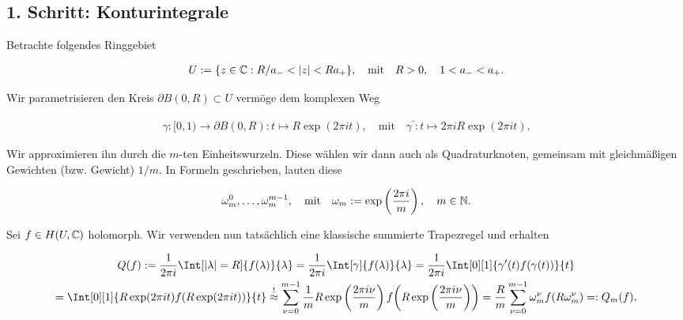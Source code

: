 \subsection*{1. Schritt: Konturintegrale}

Betrachte folgendes Ringgebiet

\begin{align*}
    U := {\left \{ z \in \mathbb{C}: R / a_- < |z| < R a_+ \right \}},
    \quad
    \text{mit}
    \quad
    R > 0,
    \quad
    1 < a_- < a_+.
\end{align*}

Wir parametrisieren den Kreis $\partial B(0, R) \subset U$ vermöge dem komplexen Weg

\begin{align*}
    \gamma: [0, 1) \to \partial B(0, R): t \mapsto R \exp(2 \pi i t),
    \quad
    \text{mit}
    \quad
    \gamma^\prime: t \mapsto 2 \pi i R \exp(2 \pi i t).
\end{align*}

Wir approximieren ihn durch die $m$-ten Einheitswurzeln.
Diese wählen wir dann auch als Quadraturknoten, gemeinsam mit gleichmäßigen Gewichten (bzw. Gewicht) $1 / m$.
In Formeln geschrieben, lauten diese

\begin{align*}
    \omega_m^0, \dots, \omega_m^{m - 1},
    \quad
    \text{mit}
    \quad
    \omega_m := \exp\left(\frac{2 \pi i}{m}\right),
    \quad
    m \in \mathbb{N}.
\end{align*}

Sei $f \in H(U, \mathbb{C})$ holomorph.
Wir verwenden nun tatsächlich eine klassische summierte Trapezregel und erhalten

\begin{multline*}
    Q(f)
    :=
    \frac{1}{2 \pi i}
    \Int[|\lambda| = R]
    {
        f(\lambda)
    }{\lambda}
    =
    \frac{1}{2 \pi i}
    \Int[\gamma]
    {
        f(\lambda)
    }{\lambda}
    =
    \frac{1}{2 \pi i}
    \Int[0][1]
    {
        \gamma^\prime(t)
        f(\gamma(t))
    }{t} \\
    =
    \Int[0][1]
    {
        R
        \exp(2 \pi i t)
        f(R \exp(2 \pi i t))
    }{t}
    \stackrel{!}{\approx}
    \sum_{\nu = 0}^{m-1}
        \frac{1}{m}
        R \exp\left(\frac{2 \pi i \nu}{m}\right)
        f
        \pbraces
        {
            R \exp\left(\frac{2 \pi i \nu}{m}\right)
        }
    =
    \frac{R}{m}
    \sum_{\nu = 0}^{m-1}
        \omega_m^\nu
        f(R \omega_m^\nu)
    =:
    Q_m(f).
\end{multline*}

